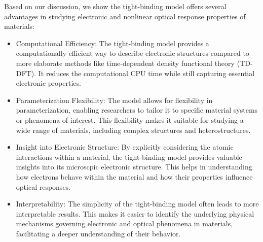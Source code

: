 Based on our discussion, we show the tight-binding model offers several advantages in studying electronic and nonlinear optical response properties of materials:
\begin{itemize}
	\item Computational Efficiency: The tight-binding model provides a computationally efficient way to describe electronic structures compared to more elaborate methods like time-dependent density functional theory (TD-DFT). It reduces the computational CPU time while still capturing essential electronic properties.

	\item Parameterization Flexibility: The model allows for flexibility in parameterization, enabling researchers to tailor it to specific material systems or phenomena of interest. This flexibility makes it suitable for studying a wide range of materials, including complex structures and heterostructures.

	\item Insight into Electronic Structure: By explicitly considering the atomic interactions within a material, the tight-binding model provides valuable insights into its microscpic electronic structure. This helps in understanding how electrons behave within the material and how their properties influence optical responses.

	\item Interpretability: The simplicity of the tight-binding model often leads to more interpretable results. This makes it easier to identify the underlying physical mechanisms governing electronic and optical phenomena in materials, facilitating a deeper understanding of their behavior.
\end{itemize}

